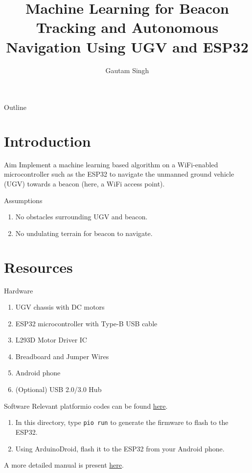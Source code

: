 \documentclass{beamer}
\title[Beacon Tracking Using Machine Learning]{Machine Learning for Beacon Tracking and Autonomous Navigation Using UGV and ESP32}
\author{Gautam Singh}
\theoremstyle{remark}
\begin{document}
\begin{frame}
    \titlepage 
\end{frame}

\logo{}

\begin{frame}{Outline}
    \tableofcontents
\end{frame}


\section{Introduction}
\begin{frame}{Aim}
    Implement a machine learning based algorithm on a WiFi-enabled 
    microcontroller such as the ESP32 to navigate the unmanned ground
    vehicle (UGV) towards a beacon (here, a WiFi access point).
    \pause
    \begin{alertblock}{Assumptions}
        \begin{enumerate}
            \item No obstacles surrounding UGV and beacon.
            \item No undulating terrain for beacon to navigate.
        \end{enumerate}
    \end{alertblock}
\end{frame}

\section{Resources}
\begin{frame}{Hardware}
    \begin{enumerate}
        \item UGV chassis with DC motors
        \item ESP32 microcontroller with Type-B USB cable
        \item L293D Motor Driver IC
        \item Breadboard and Jumper Wires
        \item Android phone
        \item (Optional) USB 2.0/3.0 Hub
    \end{enumerate}
\end{frame}

\begin{frame}[label=software]{Software}
Relevant platformio codes can be found 
\href{https://github.com/goats-9/ee2802-assignments/tree/main/ugv-beacon/codes}{here}.
\begin{enumerate}
    \item In this directory, type \texttt{pio run} to generate the firmware to
    flash to the ESP32.
    \item Using ArduinoDroid, flash it to the ESP32 from your Android phone.
\end{enumerate}
A more detailed manual is present \href{https://github.com/goats-9/ee2802-assignments/tree/main/ugv-beacon/main.pdf}{here}.
\end{frame}
\end{document}
